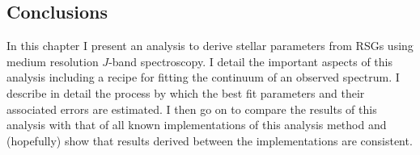 \subsection{Conclusions} %
\label{sub:conclusions}
In this chapter I present an analysis to derive stellar parameters from RSGs using medium resolution $J$-band spectroscopy.
I detail the important aspects of this analysis including a recipe for fitting the continuum of an observed spectrum.
I describe in detail the process by which the best fit parameters and their associated errors are estimated.
I then go on to compare the results of this analysis with that of all known implementations of this analysis method and (hopefully) show that results derived between the implementations are consistent.

% 
% 
